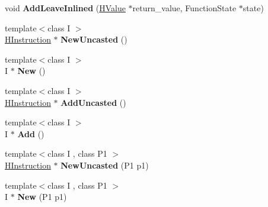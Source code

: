 \begin{DoxyCompactItemize}
\item 
\hypertarget{classv8_1_1internal_1_1_h_graph_builder_a50e208c659ee3412eca8d0bfb9496b9e}{}void {\bfseries Add\+Leave\+Inlined} (\hyperlink{classv8_1_1internal_1_1_h_value}{H\+Value} $\ast$return\+\_\+value, Function\+State $\ast$state)\label{classv8_1_1internal_1_1_h_graph_builder_a50e208c659ee3412eca8d0bfb9496b9e}

\item 
\hypertarget{classv8_1_1internal_1_1_h_graph_builder_aad1aec7021a863f7ee3063eace5e6bb1}{}{\footnotesize template$<$class I $>$ }\\\hyperlink{classv8_1_1internal_1_1_h_instruction}{H\+Instruction} $\ast$ {\bfseries New\+Uncasted} ()\label{classv8_1_1internal_1_1_h_graph_builder_aad1aec7021a863f7ee3063eace5e6bb1}

\item 
\hypertarget{classv8_1_1internal_1_1_h_graph_builder_a0d8a69b10a17d9a58d8a57522787470a}{}{\footnotesize template$<$class I $>$ }\\I $\ast$ {\bfseries New} ()\label{classv8_1_1internal_1_1_h_graph_builder_a0d8a69b10a17d9a58d8a57522787470a}

\item 
\hypertarget{classv8_1_1internal_1_1_h_graph_builder_aa3c94f36b42da5aadc5a4b670e059ecc}{}{\footnotesize template$<$class I $>$ }\\\hyperlink{classv8_1_1internal_1_1_h_instruction}{H\+Instruction} $\ast$ {\bfseries Add\+Uncasted} ()\label{classv8_1_1internal_1_1_h_graph_builder_aa3c94f36b42da5aadc5a4b670e059ecc}

\item 
\hypertarget{classv8_1_1internal_1_1_h_graph_builder_ac9903cf29b61067b844affba8e65f1ae}{}{\footnotesize template$<$class I $>$ }\\I $\ast$ {\bfseries Add} ()\label{classv8_1_1internal_1_1_h_graph_builder_ac9903cf29b61067b844affba8e65f1ae}

\item 
\hypertarget{classv8_1_1internal_1_1_h_graph_builder_ad2e27f0614e05c78dfb90d6520a278de}{}{\footnotesize template$<$class I , class P1 $>$ }\\\hyperlink{classv8_1_1internal_1_1_h_instruction}{H\+Instruction} $\ast$ {\bfseries New\+Uncasted} (P1 p1)\label{classv8_1_1internal_1_1_h_graph_builder_ad2e27f0614e05c78dfb90d6520a278de}

\item 
\hypertarget{classv8_1_1internal_1_1_h_graph_builder_af0bdf90d8159037ff8e4295a5a9eddfb}{}{\footnotesize template$<$class I , class P1 $>$ }\\I $\ast$ {\bfseries New} (P1 p1)\label{classv8_1_1internal_1_1_h_graph_builder_af0bdf90d8159037ff8e4295a5a9eddfb}


\end{DoxyCompactItemize}
